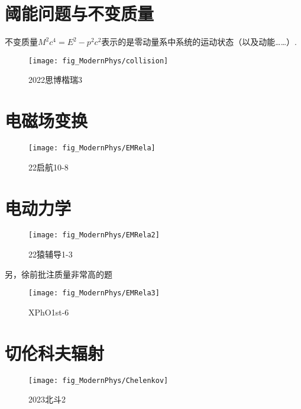 \documentclass[a4paper]{article}
\begin{document}
	\section{阈能问题与不变质量}
	不变质量$M^2 c^4=E^2-p^2c^2$表示的是零动量系中系统的运动状态（以及动能……）.
	\begin{figure}[H]
		\centering
		\texttt{[image: fig\_ModernPhys/collision]}
		\caption{2022思博楷瑞3}
		\label{fig:collision}
	\end{figure}
	
	\section{电磁场变换}
	\begin{figure}[H]
		\centering
		\texttt{[image: fig\_ModernPhys/EMRela]}
		\caption{22启航10-8}
		\label{fig:emrela}
	\end{figure}
	
	\section{电动力学}
	\begin{figure}[H]
		\centering
		\texttt{[image: fig\_ModernPhys/EMRela2]}
		\caption{22猿辅导1-3}
		\label{fig:emrela2}
	\end{figure}
	
	另，徐前批注质量非常高的题
	\begin{figure}[H]
		\centering
		\texttt{[image: fig\_ModernPhys/EMRela3]}
		\caption{XPhO1st-6}
		\label{fig:emrela3}
	\end{figure}
	
	\section{切伦科夫辐射}
	\begin{figure}[H]
		\centering
		\texttt{[image: fig\_ModernPhys/Chelenkov]}
		\caption{2023北斗2}
		\label{fig:chelenkov}
	\end{figure}
\end{document}
